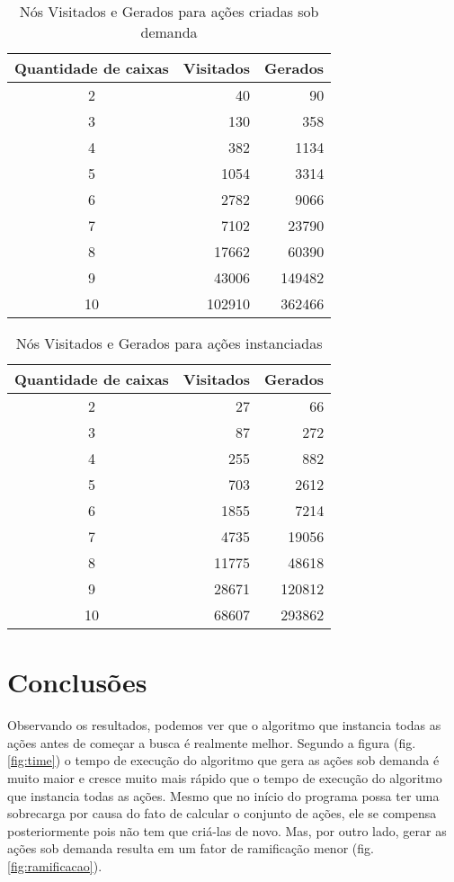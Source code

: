 \documentclass[12pt,a4paper]{article}
\begin{document}
\begin{table}[H]
\centering
\scriptsize
\begin{tabular}{|c|r|r|}
\hline
\textbf{Quantidade de caixas}	&	\textbf{Visitados}	&	
\textbf{Gerados}	\\ \hline
2	&	40	&	90	\\ \hline
3	&	130	&	358	\\ \hline
4	&	382	&	1134	\\ \hline
5	&	1054	&	3314	\\ \hline
6	&	2782	&	9066	\\ \hline
7	&	7102	&	23790	\\ \hline
8	&	17662	&	60390	\\ \hline
9	&	43006	&	149482	\\ \hline
10	&	102910	&	362466	\\ \hline
\end{tabular}	
\caption{Nós Visitados e Gerados para ações criadas sob demanda}
\label{tab:sobDemanda}
\end{table}


\begin{table}[H]
\centering
\scriptsize
\begin{tabular}[width=\textwidth]{|c|r|r|}
\hline
\textbf{Quantidade de caixas}&\textbf{Visitados}&\textbf{Gerados}	
\\ \hline
2&	27	&	66	\\ \hline
3&	87	&	272	\\ \hline
4&	255	&	882	\\ \hline
5&	703	&	2612	\\ \hline
6&	1855	&	7214	\\ \hline
7&	4735	&	19056	\\ \hline
8&	11775	&	48618	\\ \hline
9&	28671	&	120812	\\ \hline
10&	68607	&	293862	\\\hline
\end{tabular}
\caption{Nós Visitados e Gerados para ações instanciadas}
\label{tab:all}
\end{table}











\section{Conclusões}\label{conclusao}
Observando os resultados, podemos ver que o algoritmo que instancia todas as ações antes de começar a busca é realmente melhor. 
Segundo a figura (fig. \ref{fig:time}) o tempo de execução do algoritmo que gera as ações sob demanda é muito maior e cresce muito mais rápido que o tempo de execução do algoritmo que instancia todas as ações. 
Mesmo que no início do programa possa ter uma sobrecarga por causa do fato de calcular o conjunto de ações, ele se compensa posteriormente pois não tem que criá-las de novo.
Mas, por outro lado, gerar as ações sob demanda resulta em um fator de ramificação menor (fig. \ref{fig:ramificacao}).
\end{document}
